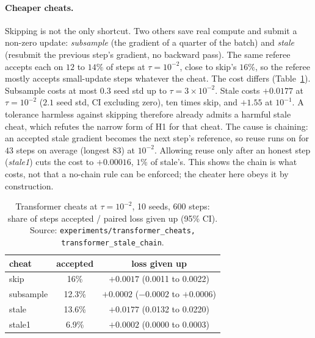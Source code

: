 \documentclass[sigconf,anonymous]{acmart}
\begin{document}
\paragraph{Cheaper cheats.} Skipping is not the only shortcut. Two others save real compute and submit a non-zero update:
\emph{subsample} (the gradient of a quarter of the batch) and \emph{stale} (resubmit the previous step's gradient, no backward pass).
The same referee accepts each on $12$ to $14\%$ of steps at $\tau=10^{-2}$, close to skip's $16\%$, so the referee mostly accepts
small-update steps whatever the cheat. The cost differs (Table~\ref{tab:cheats}). Subsample costs at most $0.3$ seed std up to
$\tau=3\times10^{-2}$. Stale costs $+0.0177$ at $\tau=10^{-2}$ ($2.1$ seed std, CI excluding zero), ten times skip, and $+1.55$ at
$10^{-1}$. A tolerance harmless against skipping therefore already admits a harmful stale cheat, which refutes the narrow form of H1
for that cheat. The cause is chaining: an accepted stale gradient becomes the next step's reference, so reuse runs on for $43$ steps on
average (longest $83$) at $10^{-2}$. Allowing reuse only after an honest step (\emph{stale1}) cuts the cost to $+0.00016$, $1\%$ of
stale's. This shows the chain is what costs, not that a no-chain rule can be enforced; the cheater here obeys it by construction.
\begin{table}[t]\caption{Transformer cheats at $\tau=10^{-2}$, 10 seeds, 600 steps: share of steps accepted / paired loss given up
(95\% CI). Source: \texttt{experiments/transformer\_cheats, transformer\_stale\_chain}.}\label{tab:cheats}\small
\begin{tabular}{lcc}
cheat & accepted & loss given up\\\hline
skip & 16\% & $+0.0017$ (0.0011 to 0.0022)\\
subsample & 12.3\% & $+0.0002$ ($-0.0002$ to $+0.0006$)\\
stale & 13.6\% & $+0.0177$ (0.0132 to 0.0220)\\
stale1 & 6.9\% & $+0.0002$ (0.0000 to 0.0003)\\
\end{tabular}\end{table}
\end{document}
